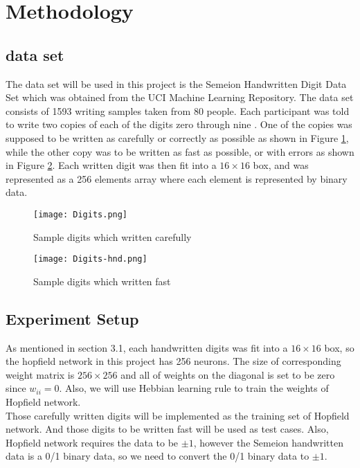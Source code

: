 \section{Methodology}
\subsection{data set}
The data set will be used in this project is the Semeion Handwritten Digit Data Set which was obtained from the UCI Machine Learning Repository. The data set consists of 1593 writing samples taken from 80 people. Each participant was told to write two copies of each of the digits zero through nine . One of the copies was supposed to be written as carefully or correctly as possible as shown in Figure \ref{fg:ds1}, while the other copy was to be written as fast as possible, or with errors as shown in Figure \ref{fg:ds2}. Each written digit was then fit into a $16 \times 16$ box, and was represented as a 256 elements array where each element is represented by binary data.\\

\begin{figure}[h]
\centering
\texttt{[image: Digits.png]}
\caption{Sample digits which written carefully}
\label{fg:ds1}
\end{figure}

\begin{figure}[h]
\centering
\texttt{[image: Digits-hnd.png]}
\caption{Sample digits which written fast}
\label{fg:ds2}
\end{figure}

\subsection{Experiment Setup}
As mentioned in section 3.1, each handwritten digits was fit into a $16 \times 16$ box, so the hopfield network in this project has 256 neurons. The size of corresponding weight matrix is $256 \times 256$ and all of weights on the diagonal is set to be zero since $w_{ii} = 0$. Also, we will use Hebbian learning rule to train the weights of Hopfield network.\\

Those carefully written digits will be implemented as the training set of Hopfield network. And those digits to be written fast will be used as test cases. Also, Hopfield network requires the data to be $\pm 1$, however the Semeion handwritten data is a 0/1 binary data, so we need to convert the 0/1 binary data to $\pm 1$. \\

